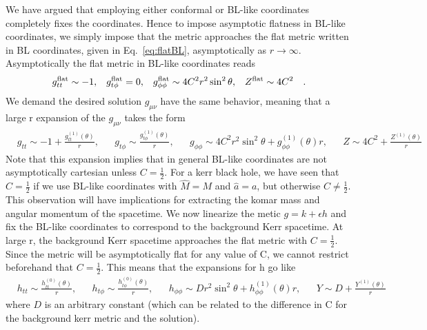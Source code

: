 \documentclass[aps,prd,amsmath,showpacs,amssymb,superscriptaddress,nofootinbib,longbibliography,eqsecnum,preprintnumbers]{revtex4-1}
\begin{document}
We have argued that employing either conformal or BL-like coordinates completely fixes the coordinates. Hence to impose asymptotic flatness in BL-like coordinates, we simply impose that the metric approaches the flat metric written in BL coordinates, given in Eq.~\eqref{eq:flatBL}, asymptotically as $r\to \infty$. Asymptotically the flat metric in BL-like coordinates reads
\begin{align}
&g_{tt}^{\rm flat}\sim -1,& &g_{t\phi}^{\rm flat}=0,& &g_{\phi\phi}^{\rm flat}\sim 4C^2r^2\sin^2\theta,& &Z^{\rm flat}\sim 4C^2&.
\end{align}
We demand the desired solution $g_{\mu\nu}$ have the same behavior, meaning that a large r expansion of the $g_{\mu \nu}$ takes the form
\begin{align}
&g_{tt}\sim -1 +\frac{g_{tt}^{(1)}(\theta)}{r},& &g_{t\phi}\sim \frac{g_{t\phi}^{(1)}(\theta)}{r},& &g_{\phi\phi}\sim 4C^2r^2\sin^2\theta +g_{\phi \phi}^{(1)}(\theta)r,& &Z\sim 4C^2+\frac{Z^{(1)}(\theta)}{r}& \label{eq:nlaf}
\end{align}
Note that this expansion implies that in general BL-like coordinates are not asymptotically cartesian unless $C=\frac{1}{2}$. For a kerr black hole, we have seen that $C=\frac{1}{2}$ if we use BL-like coordinates with $\hat M= M$ and $\hat a =a$, but otherwise $C\neq \frac{1}{2}$. This observation will have implications for extracting the komar mass and angular momentum of the spacetime.
We now linearize the metic $g=k+\epsilon h$ and fix the BL-like coordinates to correspond to the background Kerr spacetime. At large r, the background Kerr spacetime approaches the flat metric with $C=\frac{1}{2}$. Since the metric will be asymptotically flat for any value of C, we cannot restrict beforehand that $C=\frac{1}{2}$. This means that the expansions for h go like
\begin{align}
&h_{tt}\sim \frac{h_{tt}^{(0)}(\theta)}{r},& &h_{t\phi}\sim \frac{h_{t\phi}^{(0)}(\theta)}{r},& &h_{\phi\phi}\sim D r^2\sin^2\theta + h_{\phi \phi}^{(1)}(\theta)r,& &Y\sim D + \frac{Y^{(1)}(\theta)}{r}& \label{eq:afcond}
\end{align}
where $D$ is an arbitrary constant (which can be related to the difference in C for the background kerr metric and the solution).
\end{document}
